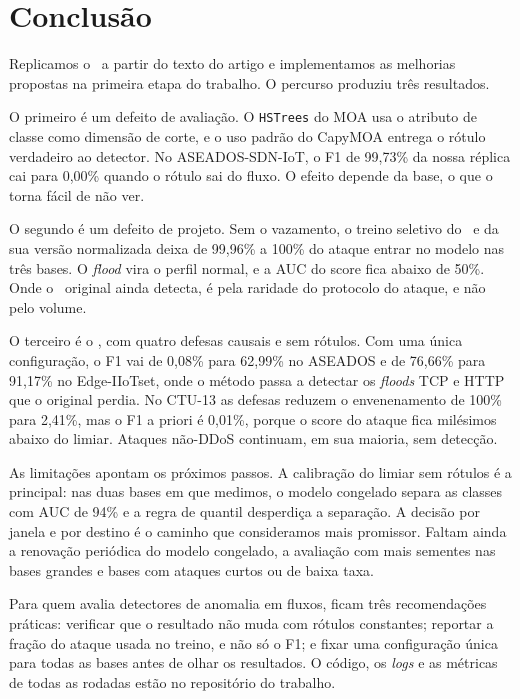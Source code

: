 \section{Conclusão}
\label{sec:conclusion}

Replicamos o \modus\ a partir do texto do artigo e implementamos as melhorias propostas na primeira
etapa do trabalho. O percurso produziu três resultados.

O primeiro é um defeito de avaliação. O \texttt{HSTrees} do MOA usa o atributo de classe como
dimensão de corte, e o uso padrão do CapyMOA entrega o rótulo verdadeiro ao detector. No
ASEADOS-SDN-IoT, o F1 de 99,73\% da nossa réplica cai para 0,00\% quando o rótulo sai do fluxo. O
efeito depende da base, o que o torna fácil de não ver.

O segundo é um defeito de projeto. Sem o vazamento, o treino seletivo do \modus\ e da sua versão
normalizada deixa de 99,96\% a 100\% do ataque entrar no modelo nas três bases. O \emph{flood}
vira o perfil normal, e a AUC do score fica abaixo de 50\%. Onde o \modus\ original ainda detecta,
é pela raridade do protocolo do ataque, e não pelo volume.

O terceiro é o \modusp, com quatro defesas causais e sem rótulos. Com uma única configuração, o F1
vai de 0,08\% para 62,99\% no ASEADOS e de 76,66\% para 91,17\% no Edge-IIoTset, onde o método
passa a detectar os \emph{floods} TCP e HTTP que o original perdia. No CTU-13 as defesas reduzem o
envenenamento de 100\% para 2,41\%, mas o F1 a priori é 0,01\%, porque o score do ataque fica
milésimos abaixo do limiar. Ataques não-DDoS continuam, em sua maioria, sem detecção.

As limitações apontam os próximos passos. A calibração do limiar sem rótulos é a principal: nas
duas bases em que medimos, o modelo congelado separa as classes com AUC de 94\% e a regra de quantil
desperdiça a separação. A decisão por janela e por destino é o caminho que consideramos mais
promissor. Faltam ainda a renovação periódica do modelo congelado, a avaliação com mais sementes
nas bases grandes e bases com ataques curtos ou de baixa taxa.

Para quem avalia detectores de anomalia em fluxos, ficam três recomendações práticas: verificar
que o resultado não muda com rótulos constantes; reportar a fração do ataque usada no treino, e
não só o F1; e fixar uma configuração única para todas as bases antes de olhar os resultados. O
código, os \emph{logs} e as métricas de todas as rodadas estão no repositório do trabalho.
